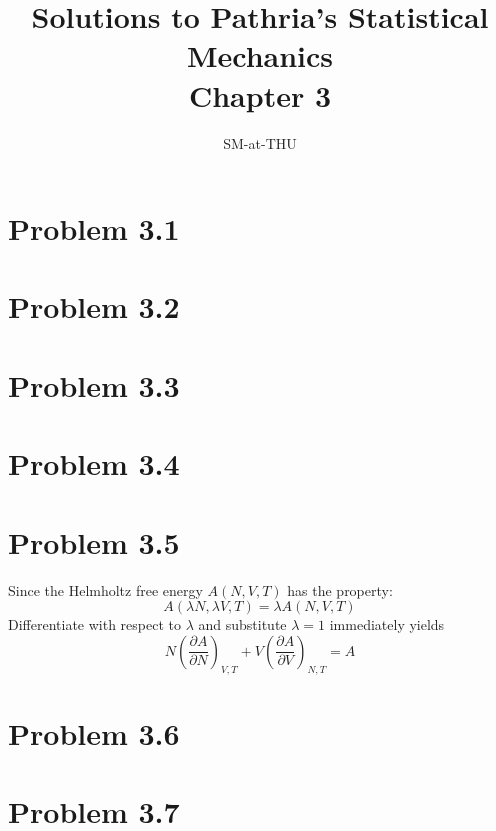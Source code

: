 \documentclass{article}
\author{SM-at-THU}
\title{\bf{Solutions to Pathria's Statistical Mechanics}\\Chapter 3}
\begin{document}
\maketitle

\section*{Problem 3.1}

\section*{Problem 3.2}

\section*{Problem 3.3}

\section*{Problem 3.4}

\section*{Problem 3.5}
	Since the Helmholtz free energy $A(N,V,T)$ has the property:
	\begin{equation*}
		A(\lambda N,\lambda V,T) = \lambda A(N,V,T)
	\end{equation*}
	Differentiate with respect to $\lambda$ and substitute $\lambda=1$ immediately yields
	\begin{equation*}
		N\left( \frac{ \partial A }{\partial N} \right)_{V,T}+V \left( \frac{ \partial A }{\partial V} \right)_{N,T} = A
	\end{equation*}

\section*{Problem 3.6}

\section*{Problem 3.7}
\end{document}
